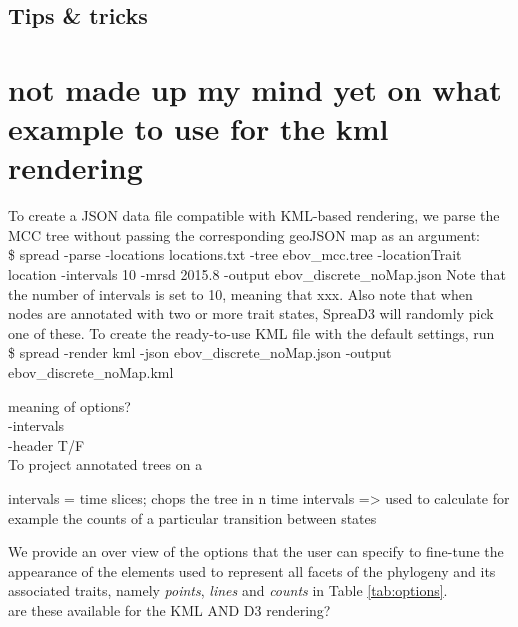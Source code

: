 \documentclass[english]{paper}
\begin{document}
\subsection{Tips \& tricks}
\label{tips}
% 

\section{not made up my mind yet on what example to use for the kml rendering}

To create a JSON data file compatible with KML-based rendering, we parse the MCC tree without passing the corresponding geoJSON map as an argument:
\\
\$ spread -parse -locations locations.txt -tree ebov\_mcc.tree -locationTrait location -intervals 10 -mrsd 2015.8 -output ebov\_discrete\_noMap.json
Note that the number of intervals is set to 10, meaning that xxx.
Also note that when nodes are annotated with two or more trait states, SpreaD3 will randomly pick one of these.  
To create the ready-to-use KML file with the default settings, run
\\
\$ spread -render kml -json ebov\_discrete\_noMap.json -output ebov\_discrete\_noMap.kml
\par
meaning of options?
\\-intervals
\\-header T/F
\\
To project annotated trees on a

intervals = time slices; chops the tree in n time intervals => used to calculate for example the counts of a particular transition between states
 
\par
We provide an over view of the options that the user can specify to fine-tune the appearance of the elements used to represent all facets of the phylogeny and its associated traits, namely \textit{points}, \textit{lines} and \textit{counts} in Table \ref{tab:options}.
\\are these available for the KML AND D3 rendering?
\end{document}
